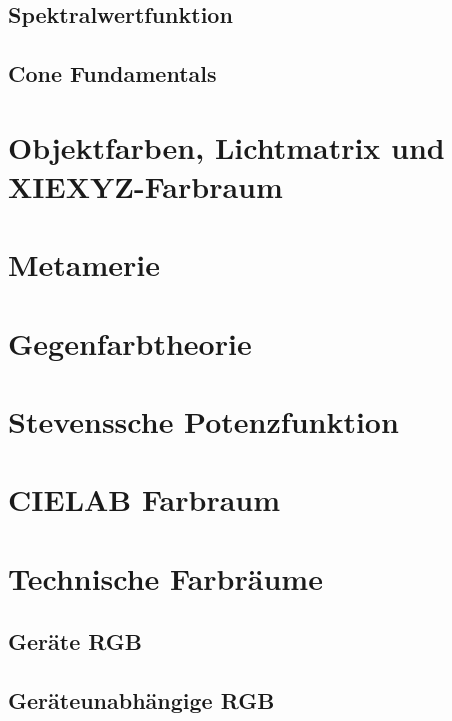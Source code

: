 \documentclass[a4paper, 11pt, accentcolor = tud3b]{tudreport}
\begin{document}
			\subsection{Spektralwertfunktion} %

			\subsection{Cone Fundamentals} %

		\section{Objektfarben, Lichtmatrix und XIEXYZ-Farbraum} %

		\section{Metamerie} %

		\section{Gegenfarbtheorie} %

		\section{Stevenssche Potenzfunktion} %

		\section{CIELAB Farbraum} %

		\section{Technische Farbräume} %

			\subsection{Geräte RGB} %

			\subsection{Geräteunabhängige RGB} %
\end{document}
